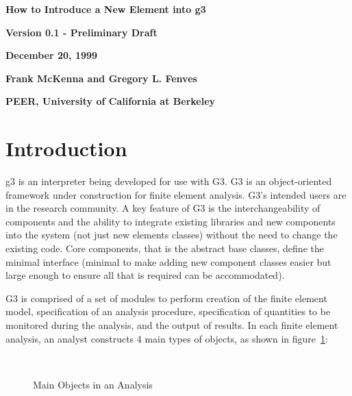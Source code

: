 \documentclass[12pt]{article}
\begin{document}


\begin{center}
{\bf \Large How to Introduce a New Element into g3}

{\bf Version 0.1 - Preliminary Draft} 

{\bf  December 20, 1999} 

{\bf  Frank McKenna and Gregory L. Fenves} 

{\bf  PEER, University of California at Berkeley}
\end{center}

\vspace{.2in}
\section{Introduction}
g3 is an interpreter being developed for use with G3.
G3 is an object-oriented framework under construction for finite element 
analysis. G3's intended users are in the research community. A key feature
of G3 is the interchangeability of components and the ability to
integrate existing libraries and new components into the system (not just new
elements classes) without the need to change the existing code. Core
components, that is the abstract base classes, define the minimal
interface (minimal to make adding new component classes easier but 
large enough to ensure all that is required can be accommodated).

G3 is comprised of a set of modules to perform creation of the finite 
element model, specification of an analysis procedure, specification 
of quantities to be monitored during the analysis, and the output of results.
In each finite element analysis, an analyst constructs 4 main types of
objects, as shown in figure~\ref{main}:

\begin{figure}[htpb]
\begin{center}
\leavevmode
\hbox{%
}
\end{center}
\caption{Main Objects in an Analysis}
\label{main}
\end{figure}
\end{document}
